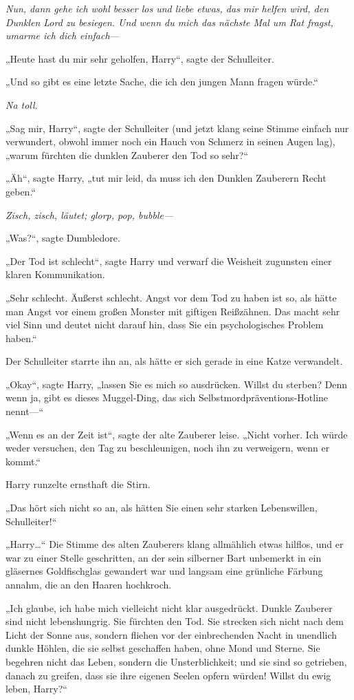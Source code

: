 {\emph{Nun, dann gehe ich wohl besser los und liebe etwas, das mir helfen wird, den Dunklen Lord zu besiegen. Und wenn du mich das nächste Mal um Rat fragst, umarme ich dich einfach}—

„Heute hast du mir sehr geholfen, Harry“, sagte der Schulleiter.

„Und so gibt es eine letzte Sache, die ich den jungen Mann fragen würde.“

\emph{Na toll.}

„Sag mir, Harry“, sagte der Schulleiter (und jetzt klang seine Stimme einfach nur verwundert, obwohl immer noch ein Hauch von Schmerz in seinen Augen lag), „warum fürchten die dunklen Zauberer den Tod so sehr?“

„Äh“, sagte Harry, „tut mir leid, da muss ich den Dunklen Zauberern Recht geben.“

\emph{Zisch, zisch, läutet; glorp, pop, bubble—}

„Was?“, sagte Dumbledore.

„Der Tod ist schlecht“, sagte Harry und verwarf die Weisheit zugunsten einer klaren Kommunikation.

„Sehr schlecht. Äußerst schlecht. Angst vor dem Tod zu haben ist so, als hätte man Angst vor einem großen Monster mit giftigen Reißzähnen. Das macht sehr viel Sinn und deutet nicht darauf hin, dass Sie ein psychologisches Problem haben.“

Der Schulleiter starrte ihn an, als hätte er sich gerade in eine Katze verwandelt.

„Okay“, sagte Harry, „lassen Sie es mich so ausdrücken. Willst du sterben? Denn wenn ja, gibt es dieses Muggel-Ding, das sich Selbstmordpräventions-Hotline nennt—“

„Wenn es an der Zeit ist“, sagte der alte Zauberer leise. „Nicht vorher. Ich würde weder versuchen, den Tag zu beschleunigen, noch ihn zu verweigern, wenn er kommt.“

Harry runzelte ernsthaft die Stirn.

„Das hört sich nicht so an, als hätten Sie einen sehr starken Lebenswillen, Schulleiter!“

„Harry…“ Die Stimme des alten Zauberers klang allmählich etwas hilflos, und er war zu einer Stelle geschritten, an der sein silberner Bart unbemerkt in ein gläsernes Goldfischglas gewandert war und langsam eine grünliche Färbung annahm, die an den Haaren hochkroch.

„Ich glaube, ich habe mich vielleicht nicht klar ausgedrückt. Dunkle Zauberer sind nicht lebenshungrig. Sie fürchten den Tod. Sie strecken sich nicht nach dem Licht der Sonne aus, sondern fliehen vor der einbrechenden Nacht in unendlich dunkle Höhlen, die sie selbst geschaffen haben, ohne Mond und Sterne. Sie begehren nicht das Leben, sondern die Unsterblichkeit; und sie sind so getrieben, danach zu greifen, dass sie ihre eigenen Seelen opfern würden! Willst du ewig leben, Harry?“

}
